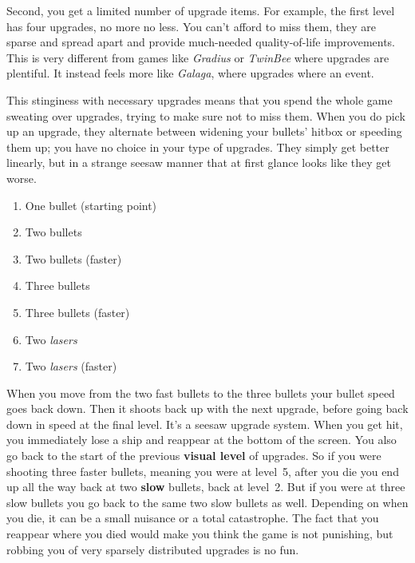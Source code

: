 \documentclass{book}
\begin{document}
Second, you get a limited number of upgrade items. For example, the first level has four upgrades, no more no less. You can’t afford to miss them, they are sparse and spread apart and provide much-needed quality-of-life improvements. This is very different from games like \emph{Gradius} or \emph{TwinBee} where upgrades are plentiful. It instead feels more like \emph{Galaga}, where upgrades where an event.\par
This stinginess with necessary upgrades means that you spend the whole game sweating over upgrades, trying to make sure not to miss them. When you do pick up an upgrade, they alternate between widening your bullets’ hitbox or speeding them up; you have no choice in your type of upgrades. They simply get better linearly, but in a strange seesaw manner that at first glance looks like they get worse.\par
\begin{enumerate}
\item One bullet (starting point)
\item Two bullets
\item Two bullets (faster)
\item Three bullets
\item Three bullets (faster)
\item Two \emph{lasers}
\item Two \emph{lasers} (faster)
\end{enumerate}
When you move from the two fast bullets to the three bullets your bullet speed goes back down. Then it shoots back up with the next upgrade, before going back down in speed at the final level. It’s a seesaw upgrade system. When you get hit, you immediately lose a ship and reappear at the bottom of the screen. You also go back to the start of the previous \textbf{visual level} of upgrades. So if you were shooting three faster bullets, meaning you were at level~5, after you die you end up all the way back at two \textbf{slow} bullets, back at level~2. But if you were at three slow bullets you go back to the same two slow bullets as well. Depending on when you die, it can be a small nuisance or a total catastrophe. The fact that you reappear where you died would make you think the game is not punishing, but robbing you of very sparsely distributed upgrades is no fun.\par
\FloatBarrier\vspace{\baselineskip}\centering
\begin{minipage}{0.45\linewidth}\end{minipage}\vspace{2pt}
\end{document}
